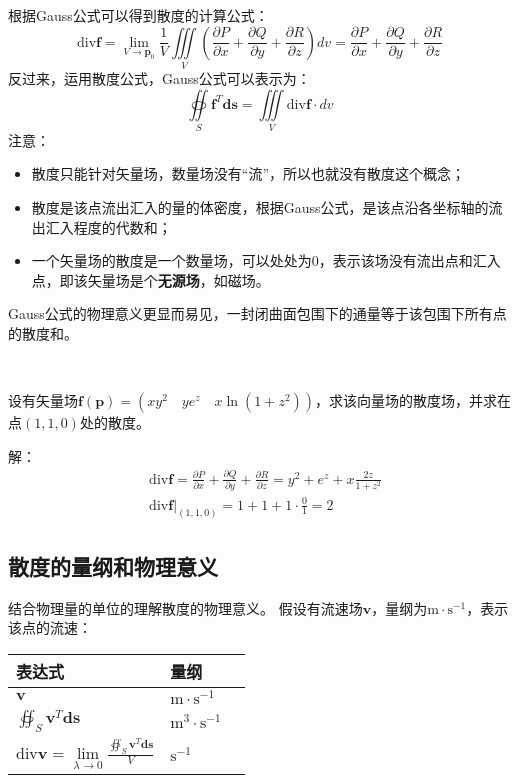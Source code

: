 根据Gauss公式可以得到散度的计算公式：
\[
\mathrm{div}\boldsymbol{f}=\underset{V\rightarrow \boldsymbol{p}_0}{{\lim}}\frac{1}{V}\iiint\limits_V{\left( \frac{\partial P}{\partial x}+\frac{\partial Q}{\partial y}+\frac{\partial R}{\partial z} \right) dv}=\frac{\partial P}{\partial x}+\frac{\partial Q}{\partial y}+\frac{\partial R}{\partial z}
\]
反过来，运用散度公式，Gauss公式可以表示为：
\[
\oiint\limits_S{\boldsymbol{f}^T\boldsymbol{ds}}=\iiint\limits_V{\mathrm{div}\boldsymbol{f}\cdot dv}
\]
注意：
\begin{itemize}
    \item 散度只能针对矢量场，数量场没有“流”，所以也就没有散度这个概念；
    \item 散度是该点流出汇入的量的体密度，根据Gauss公式，是该点沿各坐标轴的流出汇入程度的代数和；
    \item 一个矢量场的散度是一个数量场，可以处处为0，表示该场没有流出点和汇入点，即该矢量场是个{\bf 无源场}，如磁场。
\end{itemize}

\begin{tcolorbox}
Gauss公式的物理意义更显而易见，一封闭曲面包围下的通量等于该包围下所有点的散度和。
\end{tcolorbox}

~

\begin{example}
设有矢量场$\boldsymbol{f}\left( \boldsymbol{p} \right) =\left( xy^2 \quad ye^z \quad x\ln \left( 1+z^2 \right) \right) $，求该向量场的散度场，并求在点$\left( 1,1,0 \right) $处的散度。
\end{example}

解：
\begin{align*}
&\mathrm{div}\boldsymbol{f}=\frac{\partial P}{\partial x}+\frac{\partial Q}{\partial y}+\frac{\partial R}{\partial z}=y^2+e^z+x\frac{2z}{1+z^2} \\
&\left. \mathrm{div}\boldsymbol{f} \right|_{\left( 1,1,0 \right)}=1+1+1\cdot \frac{0}{1}=2
\end{align*}

\subsection{散度的量纲和物理意义}

结合物理量的单位的理解散度的物理意义。
假设有流速场$\boldsymbol{v}$，量纲为$\mathrm{m}\cdot \mathrm{s}^{-1}$，表示该点的流速：

\begin{table}[h]
\centering
\begin{tabular}{lll}
    \toprule
    表达式 & 量纲\\
    \midrule
    $\boldsymbol{v}$ & $\mathrm{m}\cdot \mathrm{s}^{-1}$\\
    $\oiint_S{\boldsymbol{v}^T\boldsymbol{ds}}$ & $\mathrm{m}^3\cdot \mathrm{s}^{-1}$\\
    $\mathrm{div}\boldsymbol{v}=\underset{\lambda \rightarrow 0}{\lim}\frac{\oiint_S{\boldsymbol{v}^T\boldsymbol{ds}}}{V}$ & $\mathrm{s}^{-1}$\\
    \bottomrule
\end{tabular}
\end{table}

